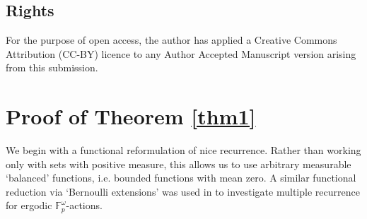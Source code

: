 \documentclass[reqno,a4paper,12pt]{amsart}
\theoremstyle{definition}
\theoremstyle{remark}
\begin{document}
\subsection*{Rights}

For the purpose of open access, the author has applied a Creative Commons Attribution (CC-BY) licence to any Author Accepted Manuscript version arising from this submission.

\section{Proof of Theorem \ref{thm1}}

We begin with a functional reformulation of nice recurrence. Rather than working only with sets with positive measure, this allows us to use arbitrary measurable `balanced' functions, i.e. bounded functions with mean zero. A similar functional reduction via `Bernoulli extensions' was used in \cite[Proof of Theorem 10.1]{BTZ2015} to investigate multiple recurrence for ergodic $\mathbb{F}_p^\omega$-actions.
\end{document}
